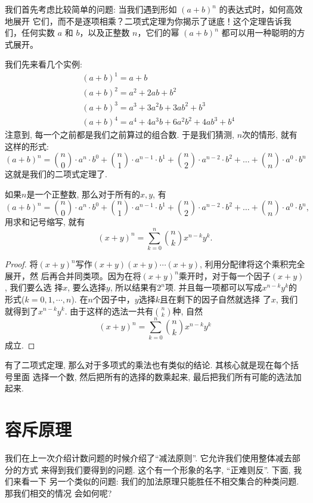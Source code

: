 我们首先考虑比较简单的问题: 当我们遇到形如 $(a + b)^n$ 的表达式时，如何高效地展开
它们，而不是逐项相乘？二项式定理为你揭示了谜底！这个定理告诉我们，任何实数 $a$ 和 
$b$，以及正整数 $n$，它们的幂 $(a + b)^n$ 都可以用一种聪明的方式展开。

我们先来看几个实例: 
\begin{align*}
&(a + b)^1 = a + b \\
&(a + b)^2 = a^2 + 2ab + b^2 \\
&(a + b)^3 = a^3 + 3a^2b + 3ab^2 + b^3 \\
&(a + b)^4 = a^4 + 4a^3b + 6a^2b^2 + 4ab^3 + b^4
\end{align*}
注意到, 每一个之前都是我们之前算过的组合数. 于是我们猜测, $n$次的情形, 就有
这样的形式: 
\[
(a + b)^n = \binom{n}{0} \cdot a^n \cdot b^0 + \binom{n}{1} \cdot a^{n-1} \cdot b^1 + \binom{n}{2} \cdot a^{n-2} \cdot b^2 + \ldots + \binom{n}{n} \cdot a^0 \cdot b^n
\]
这就是我们的二项式定理了. 

\begin{theorem}[二项式定理]
    如果$n$是一个正整数, 那么对于所有的$x,y$, 有
    \[
    (a + b)^n = \binom{n}{0} \cdot a^n \cdot b^0 + \binom{n}{1} \cdot a^{n-1} \cdot b^1 + \binom{n}{2} \cdot a^{n-2} \cdot b^2 + \ldots + \binom{n}{n} \cdot a^0 \cdot b^n,
    \]
    用求和记号缩写, 就有
    $$
    (x+y)^n = \sum_{k=0}^n \binom nk x^{n-k}y^k.
    $$
\end{theorem}
\begin{proof}
    将$(x+y)^n$写作$(x+y)(x+y)\cdots(x+y)$, 利用分配律将这个乘积完全展开，然
    后再合并同类项。因为在将$(x+y)^n$乘开时，对于每一个因子$(x+y)$, 我们要么选
    择$x$, 要么选择$y$, 所以结果有$2^n$项. 并且每一项都可以写成$x^{n-k}y^k$的
    形式($k=0,1,\cdots,n$). 在$n$个因子中，$y$选择$k$且在剩下的因子自然就选择
    了$x$, 我们就得到了$x^{n-k}y^k$. 由于这样的选法一共有$\binom nk$种, 自然
    $$
    (x+y)^n=\sum_{k=0}^n\binom nkx^{n-k}y^k
    $$成立. 
\end{proof}

有了二项式定理, 那么对于多项式的乘法也有类似的结论. 其核心就是现在每个括号里面
选择一个数, 然后把所有的选择的数乘起来, 最后把我们所有可能的选法加起来.  

\section{容斥原理} 

我们在上一次介绍计数问题的时候介绍了``减法原则''. 它允许我们使用整体减去部分的方式
来得到我们要得到的问题. 这个有一个形象的名字, ``正难则反''. 下面, 我们来看一下 
另一个类似的问题: 我们的加法原理只能胜任不相交集合的种类问题. 那我们相交的情况
会如何呢? 

